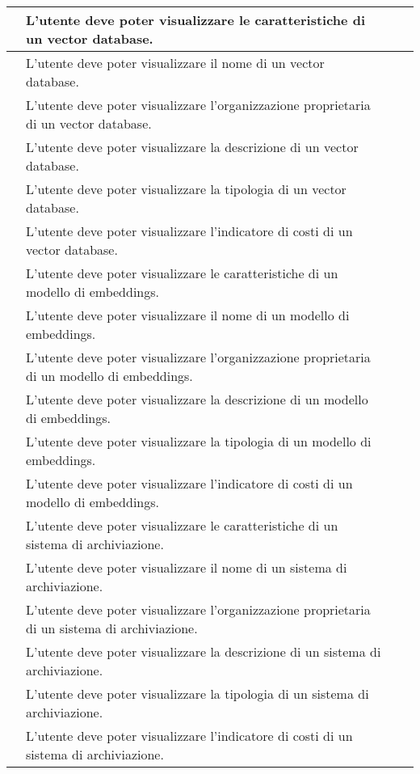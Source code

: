 \documentclass[10pt, a4paper]{article}
\begin{document}
\begin{xltabular}{\textwidth}{|c|X|c|c}
\hline {} & L'utente deve poter visualizzare le caratteristiche di un vector database. & \\
\hline {} & L'utente deve poter visualizzare il nome di un vector database. & \\
\hline {} & L'utente deve poter visualizzare l'organizzazione proprietaria di un vector database. & \\
\hline {} & L'utente deve poter visualizzare la descrizione di un vector database. & \\
\hline {} & L'utente deve poter visualizzare la tipologia di un vector database. & \\
\hline {} & L'utente deve poter visualizzare l'indicatore di costi di un vector database. & \\

\hline {} & L'utente deve poter visualizzare le caratteristiche di un modello di embeddings. & \\
\hline {} & L'utente deve poter visualizzare il nome di un modello di embeddings. & \\
\hline {} & L'utente deve poter visualizzare l'organizzazione proprietaria di un modello di embeddings. & \\
\hline {} & L'utente deve poter visualizzare la descrizione di un modello di embeddings. & \\
\hline {} & L'utente deve poter visualizzare la tipologia di un modello di embeddings. & \\
\hline {} & L'utente deve poter visualizzare l'indicatore di costi di un modello di embeddings. & \\

\hline {} & L'utente deve poter visualizzare le caratteristiche di un sistema di archiviazione. & \\
\hline {} & L'utente deve poter visualizzare il nome di un sistema di archiviazione. & \\
\hline {} & L'utente deve poter visualizzare l'organizzazione proprietaria di un sistema di archiviazione. & \\
\hline {} & L'utente deve poter visualizzare la descrizione di un sistema di archiviazione. & \\
\hline {} & L'utente deve poter visualizzare la tipologia di un sistema di archiviazione. & \\
\hline {} & L'utente deve poter visualizzare l'indicatore di costi di un sistema di archiviazione. & \\


\end{xltabular}
\end{document}
